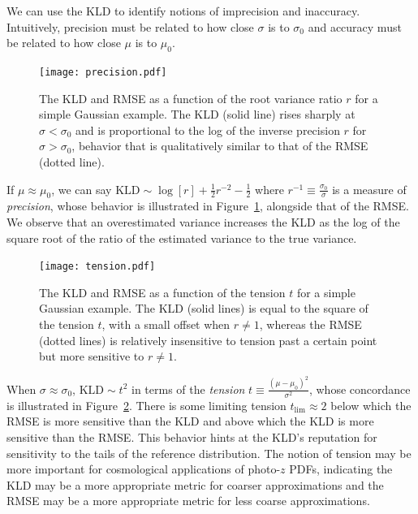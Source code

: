 \documentclass[\docopts]{\docclass}
\newcommand{\pz}{photo-$z$ PDF}
\begin{document}
We can use the KLD to identify notions of imprecision and inaccuracy.
Intuitively, precision must be related to how close $\sigma$ is to $\sigma_{0}$ 
and accuracy must be related to how close $\mu$ is to $\mu_{0}$.

\begin{figure}
  \begin{center}
    \texttt{[image: precision.pdf]}
    \caption{The KLD and RMSE as a function of the root variance ratio $r$ for 
a simple Gaussian example.
    The KLD (solid line) rises sharply at $\sigma<\sigma_{0}$ and is 
proportional to the log of the inverse precision $r$ for $\sigma>\sigma_{0}$, 
behavior that is qualitatively similar to that of the RMSE (dotted line).
    \label{fig:precision}}
  \end{center}
\end{figure}

If $\mu\approx\mu_{0}$, we can say $\mathrm{KLD}\sim\log[r] + \frac{1}{2}r^{-2} 
- \frac{1}{2}$ where $r^{-1}\equiv\frac{\sigma_{0}}{\sigma}$ is a measure of 
\textit{precision}, whose behavior is illustrated in 
Figure~\ref{fig:precision}, alongside that of the RMSE.  We observe that an 
overestimated variance increases the KLD as the log of the square root of the 
ratio of the estimated variance to the true variance.

\begin{figure}
  \begin{center}
    \texttt{[image: tension.pdf]}
    \caption{The KLD and RMSE as a function of the tension $t$ for a simple 
Gaussian example.
    The KLD (solid lines) is equal to the square of the tension $t$, with a 
small offset when $r\neq1$, whereas the RMSE (dotted lines) is relatively 
insensitive to tension past a certain point but more sensitive to $r\neq1$.
    \label{fig:tension}}
  \end{center}
\end{figure}

When $\sigma\approx\sigma_{0}$, $\mathrm{KLD}\sim t^{2}$ in terms of the 
\textit{tension} $t\equiv\frac{(\mu-\mu_{0})^{2}}{\sigma^{2}}$, whose 
concordance is illustrated in Figure~\ref{fig:tension}.
There is some limiting tension $t_{\mathrm{lim}}\approx2$ below which the RMSE 
is more sensitive than the KLD and above which the KLD is more sensitive than 
the RMSE.
This behavior hints at the KLD's reputation for sensitivity to the tails of the 
reference distribution.
The notion of tension may be more important for cosmological applications of 
\pz s, indicating the KLD may be a more appropriate metric for coarser 
approximations and the RMSE may be a more appropriate metric for less coarse 
approximations.
\end{document}
